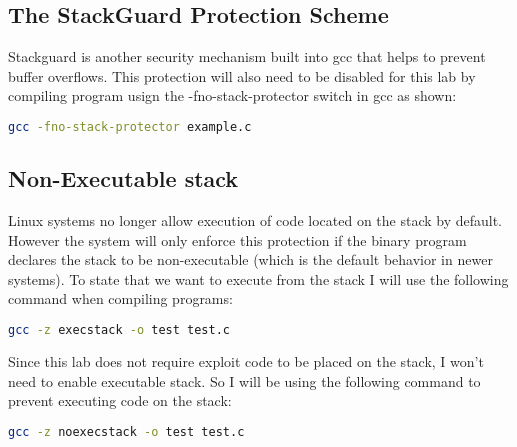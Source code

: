 \documentclass[14pt]{extarticle}
\begin{document}
\subsection{The StackGuard Protection Scheme}
Stackguard is another security mechanism built into gcc that helps to prevent buffer overflows. This protection will also need to be disabled for this lab by compiling program usign the -fno-stack-protector switch in gcc as shown\cite{seed-retlibc}:
\begin{lstlisting}[language=sh]
gcc -fno-stack-protector example.c
\end{lstlisting}

\subsection{Non-Executable stack}
Linux systems no longer allow execution of code located on the stack by default. However the system will only enforce this protection if the binary program declares the stack to be non-executable (which is the default behavior in newer systems). To state that we want to execute from the stack I will use the following command when compiling programs\cite{seed-retlibc}:
\begin{lstlisting}[language=sh]
gcc -z execstack -o test test.c
\end{lstlisting}
Since this lab does not require exploit code to be placed on the stack, I won't need to enable executable stack. So I will be using the following command to prevent executing code on the stack\cite{seed-retlibc}:
\begin{lstlisting}[language=sh]
gcc -z noexecstack -o test test.c
\end{lstlisting}
\end{document}

